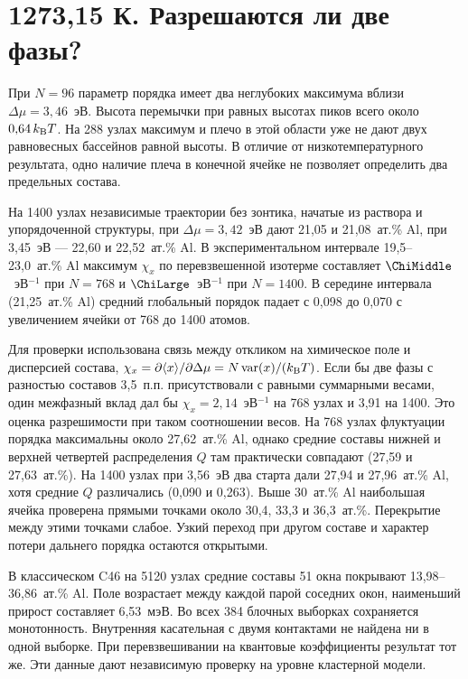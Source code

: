 \section*{1273,15 К. Разрешаются ли две фазы?}
При \(N=96\) параметр порядка имеет два неглубоких максимума вблизи
\(\Delta\mu=3{,}46\)~эВ. Высота перемычки при равных высотах пиков
всего около \(0{,}64\,k_{\rm B}T\). На 288 узлах максимум и плечо в
этой области уже не дают двух равновесных бассейнов равной высоты.
В отличие от низкотемпературного результата, одно наличие плеча
в конечной ячейке не позволяет определить два предельных состава.

На 1400 узлах независимые траектории без зонтика, начатые из раствора
и упорядоченной структуры, при \(\Delta\mu=3{,}42\)~эВ дают
21,05 и 21,08~ат.\% Al, при 3,45~эВ --- 22,60 и 22,52~ат.\% Al.
В экспериментальном интервале 19,5--23,0~ат.\% Al максимум \(\chi_x\)
по перевзвешенной изотерме составляет \(\ChiMiddle\)~эВ\(^{-1}\) при
\(N=768\) и \(\ChiLarge\)~эВ\(^{-1}\) при \(N=1400\). В середине
интервала (21,25~ат.\% Al) средний глобальный порядок падает с 0,098
до 0,070 с увеличением ячейки от 768 до 1400 атомов.

Для проверки использована связь между откликом на химическое поле и
дисперсией состава, \(\chi_x=\partial\langle x\rangle/\partial\Delta\mu
=N\operatorname{var}(x)/(k_{\rm B}T)\). Если бы две фазы с разностью
составов 3,5~п.п. присутствовали с равными суммарными весами, один
межфазный вклад дал бы \(\chi_x=2{,}14\)~эВ\(^{-1}\) на 768 узлах
и 3,91 на 1400. Это оценка разрешимости при таком соотношении весов.
На 768 узлах флуктуации порядка максимальны около 27,62~ат.\% Al,
однако средние составы нижней и верхней четвертей распределения \(Q\)
там практически совпадают (27,59 и 27,63~ат.\%). На 1400 узлах при
3,56~эВ два старта дали 27,94 и 27,96~ат.\% Al, хотя средние \(Q\)
различались (0,090 и 0,263). Выше 30~ат.\% Al наибольшая ячейка
проверена прямыми точками около 30,4, 33,3 и 36,3~ат.\%. Перекрытие
между этими точками слабое. Узкий переход при
другом составе и характер потери дальнего порядка остаются открытыми.

В классическом C46 на 5120 узлах средние составы 51 окна покрывают
13,98--36,86~ат.\% Al. Поле возрастает между каждой парой соседних окон,
наименьший прирост составляет 6,53~мэВ. Во всех 384 блочных выборках
сохраняется монотонность. Внутренняя касательная с двумя контактами
не найдена ни в одной выборке. При перевзвешивании на квантовые
коэффициенты результат тот же. Эти данные дают независимую проверку
на уровне кластерной модели.
